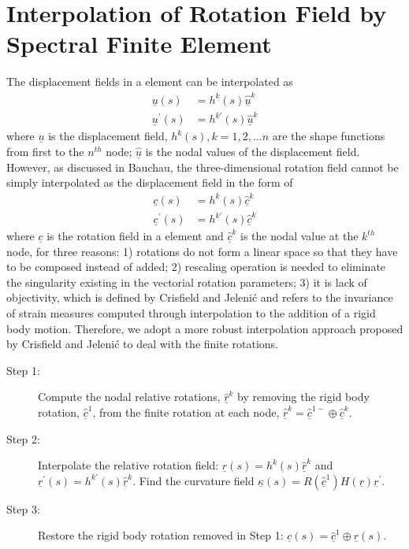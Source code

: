 \documentclass{aiaa-tc}
\renewcommand{\vec}[1]{\underline{#1}}
\begin{document}
\section{Interpolation of Rotation Field by Spectral Finite Element}
The displacement fields in a element can be interpolated as
\begin{align}
    \label{InterpolateDisp}
    \vec{u}(s) &= h^k(s) \vec{\hat{u}}^k \\
    \label{InterpolateDispp}
    \vec{u}^\prime(s) &= h^{k\prime}(s) \vec{\hat{u}}^k
\end{align}
where $\vec{u}$ is the displacement field, $h^k(s), k=1,2,...n$ are the
shape functions from first to the $n^{th}$ node; $\vec{\hat{u}}$ is the
nodal values of the displacement field. However, as discussed in
Bauchau\cite{Bauchau:2010}, the three-dimensional rotation field cannot be
simply interpolated as the displacement field in the form of
\begin{align}
    \label{InterpolateRot}
    \vec{c}(s) &= h^k(s) \vec{\hat{c}}^k \\
    \label{InterpolateRotp}
    \vec{c}^\prime(s) &= h^{k \prime}(s) \vec{\hat{c}}^k 
\end{align}    
where $\vec{c}$ is the rotation field in a element and $\vec{\hat{c}}^k$ is
the nodal value at the $k^{th}$ node, for three reasons: 1) rotations do not
form a linear space so that they have to be composed instead of added; 2)
rescaling operation is needed to eliminate the singularity existing in the
vectorial rotation parameters; 3) it is lack of objectivity, which is
defined by Crisfield and Jeleni\'c\cite{Crisfield1999} and refers
to the invariance of strain measures computed through interpolation to the
addition of a rigid body motion. Therefore, we adopt a more robust
interpolation approach proposed by Crisfield and Jeleni\'c
\cite{Crisfield1999} to deal with the finite rotations.
\begin{description}
    \item[Step 1:] Compute the nodal relative rotations, $\vec{\hat{r}}^k$ by removing the rigid body rotation, $\vec{\hat{c}}^1$, from the finite rotation at each node, $\vec{\hat{r}}^k = \vec{\hat{c}}^{1-} \oplus \vec{\hat{c}}^k$.
    \item[Step 2:] Interpolate the relative rotation field: $\vec{r}(s) = h^k(s) \vec{\hat{r}}^k$ and $\vec{r}^\prime(s) = h^{k \prime}(s) \vec{\hat{r}}^k$. Find the curvature field $\vec{\kappa}(s) = R(\vec{\hat{c}}^1)H(\vec{r}) \vec{r}^\prime$.
    \item[Step 3:] Restore the rigid body rotation removed in Step 1: $\vec{c}(s) = \vec{\hat{c}}^1 \oplus \vec{r}(s)$.
\end{description} 
\end{document}
